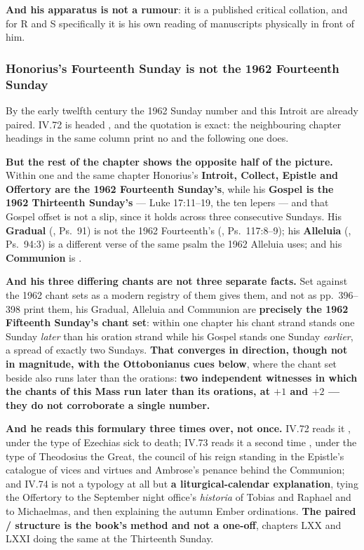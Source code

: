 \textbf{And his apparatus is not a rumour}: it is a published critical
collation, and for R and S specifically it is his own reading of manuscripts
physically in front of him.

\subsubsection*{Honorius's Fourteenth Sunday is not the 1962 Fourteenth Sunday}

By the early twelfth century the 1962 Sunday number and this Introit are
already paired.  IV.72 is headed , and the quotation is
exact: the neighbouring
chapter headings in the same column print no  and the
following one does.

\textbf{But the rest of the chapter shows the opposite half of the picture.} Within one
and the same chapter Honorius's \textbf{Introit, Collect, Epistle and
Offertory are the 1962 Fourteenth Sunday's}, while his \textbf{Gospel is the
1962 Thirteenth Sunday's} --- Luke 17:11--19, the ten lepers --- and that Gospel
offset is not a slip, since it holds across three consecutive Sundays. His
\textbf{Gradual} (, Ps.~91) is not the 1962
Fourteenth's (, Ps.~117:8--9); his
\textbf{Alleluia} (, Ps.~94:3) is a different verse
of the same psalm the 1962 Alleluia uses; and his \textbf{Communion} is
.

\textbf{And his three differing chants are not three separate facts.} Set
against the 1962 chant sets as a modern registry of them gives them, and not as
pp.~396--398 print them, his Gradual,
Alleluia and Communion are \textbf{precisely the 1962 Fifteenth Sunday's chant
set}: within one chapter his chant strand stands one Sunday \emph{later} than
his oration strand while his Gospel stands one Sunday \emph{earlier}, a spread
of exactly two Sundays. \textbf{That converges in direction, though not in
magnitude, with the Ottobonianus cues below}, where the chant set beside
 also runs later than the orations: \textbf{two
independent witnesses in which the chants of this Mass run later than its
orations, at $+1$ and $+2$ --- they do not corroborate a single number.}

\textbf{And he reads this formulary three times over, not once.}  IV.72 reads it , under the type of Ezechias sick to
death; IV.73 reads it a second time , under the type of
Theodosius the Great, the council of his reign standing in the Epistle's
catalogue of vices and virtues and Ambrose's penance behind the Communion; and
IV.74 is not a typology at all but \textbf{a liturgical-calendar explanation},
tying the Offertory to the September night office's \emph{historia} of Tobias
and Raphael and to Michaelmas, and then explaining the autumn Ember
ordinations. \textbf{The paired  /  structure
is the book's method and not a one-off}, chapters LXX and LXXI doing the same at
the Thirteenth Sunday.

